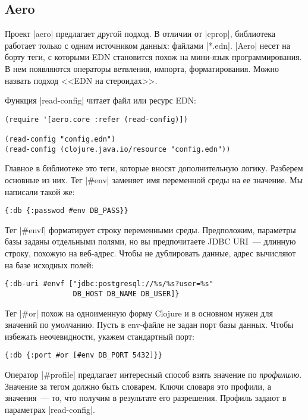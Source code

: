 \subsection{Aero}

Проект \spverb|aero| предлагает другой
подход. В отличии от \spverb|cprop|, библиотека работает только с одним
источником данных: файлами \spverb|*.edn|. \spverb|Aero| несет на борту теги, с
которыми EDN становится похож на мини-язык программирования. В нем появляются
операторы ветвления, импорта, форматирования. Можно назвать подход <<EDN на
стероидах>>.

Функция \spverb|read-config| читает файл или ресурс EDN:

\begin{verbatim}
(require '[aero.core :refer (read-config)])

(read-config "config.edn")
(read-config (clojure.java.io/resource "config.edn"))
\end{verbatim}

Главное в библиотеке это теги, которые вносят дополнительную логику. Разберем
основные из них. Тег \spverb|#env| заменяет имя переменной среды на ее
значение. Мы написали такой же:

\begin{verbatim}
{:db {:passwod #env DB_PASS}}
\end{verbatim}

Тег \spverb|#envf| форматирует строку переменными среды. Предположим, параметры
базы заданы отдельными полями, но вы предпочитаете JDBC URI~--- длинную строку,
похожую на веб-адрес. Чтобы не дублировать данные, адрес вычисляют на базе
исходных полей:

\begin{verbatim}
{:db-uri #envf ["jdbc:postgresql://%s/%s?user=%s"
                DB_HOST DB_NAME DB_USER]}
\end{verbatim}

Тег \spverb|#or| похож на одноименную форму Clojure и в основном нужен для
значений по умолчанию. Пусть в env-файле не задан порт базы данных. Чтобы
избежать неочевидности, укажем стандартный порт:

\begin{verbatim}
{:db {:port #or [#env DB_PORT 5432]}}
\end{verbatim}

Оператор \spverb|#profile| предлагает интересный способ взять значение по
\emph{профилилю}. Значение за тегом должно быть словарем. Ключи словаря это
профили, а значения~--- то, что получим в результате его разрешения. Профиль
задают в параметрах \spverb|read-config|.

